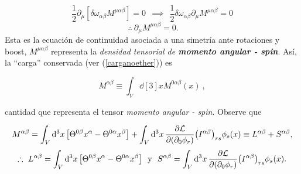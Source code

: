 \begin{equation*}
    \frac{1}{2}\partial _{\mu }[\delta \omega _{\alpha \beta }M^{\mu \alpha \beta }] = 0~\ \implies ~\ \frac{1}{2}\delta \omega _{\alpha \beta }\partial_{\mu }M^{\mu \alpha \beta }=0
\end{equation*}
\begin{equation}
        \boxed{
    ~\therefore ~\partial _{\mu }M^{\mu \alpha \beta } = 0.}
\end{equation}
Esta es la ecuación de continuidad asociada a una simetría ante rotaciones y boost, $M^{\mu \alpha \beta}$ representa la \emph{densidad tensorial de \textbf{momento angular - spin}}. Así, la ``carga'' conservada (ver (\ref{carganoether})) es

\begin{equation}
\boxed{
    M^{\alpha \beta} \equiv \int_{V} \dd[3]{x} M^{0 \alpha \beta} (x)~,
    }
    \label{eq_2.127}
\end{equation}

cantidad que representa el tensor \emph{momento angular - spin}. Observe que

\begin{equation}
    M^{\alpha \beta }=\int_{V} \dd[3]{x} \qty[\Theta ^{0\beta }x^{\alpha }-\Theta ^{0\alpha}x^{\beta }]+\int_{V} \dd[3]{x} \pdv{\mathcal{L}}{\qty(\partial_{0}\phi_{r})} \qty(I^{\alpha \beta })_{rs}\phi _{s}(x)\equiv L^{\alpha \beta }+S^{\alpha \beta },
\end{equation}
\begin{equation*}
    \therefore ~ L^{\alpha \beta} = \int_{V} \dd[3]{x} \qty[\Theta ^{0\beta }x^{\alpha }-\Theta ^{0\alpha}x^{\beta }] ~~ \text{y} ~~ S^{\alpha \beta} = \int_{V} \dd[3]{x} \pdv{\mathcal{L}}{\qty(\partial_{0}\phi_{r})} \qty(I^{\alpha \beta })_{rs}\phi _{s}(x).
\end{equation*}

